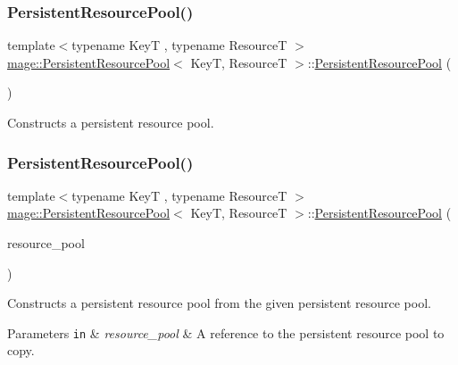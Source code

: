 \subsubsection{\texorpdfstring{Persistent\+Resource\+Pool()}{PersistentResourcePool()}\hspace{0.1cm}{\footnotesize\ttfamily [1/3]}}
{\footnotesize\ttfamily template$<$typename KeyT , typename ResourceT $>$ \\
\hyperlink{classmage_1_1_persistent_resource_pool}{mage\+::\+Persistent\+Resource\+Pool}$<$ KeyT, ResourceT $>$\+::\hyperlink{classmage_1_1_persistent_resource_pool}{Persistent\+Resource\+Pool} (\begin{DoxyParamCaption}{ }\end{DoxyParamCaption})\hspace{0.3cm}{\ttfamily [default]}}

Constructs a persistent resource pool. \hypertarget{classmage_1_1_persistent_resource_pool_a2677ca539988ead5d75be68110b6baee}{}\label{classmage_1_1_persistent_resource_pool_a2677ca539988ead5d75be68110b6baee} 
\subsubsection{\texorpdfstring{Persistent\+Resource\+Pool()}{PersistentResourcePool()}\hspace{0.1cm}{\footnotesize\ttfamily [2/3]}}
{\footnotesize\ttfamily template$<$typename KeyT , typename ResourceT $>$ \\
\hyperlink{classmage_1_1_persistent_resource_pool}{mage\+::\+Persistent\+Resource\+Pool}$<$ KeyT, ResourceT $>$\+::\hyperlink{classmage_1_1_persistent_resource_pool}{Persistent\+Resource\+Pool} (\begin{DoxyParamCaption}\item[{const \hyperlink{classmage_1_1_persistent_resource_pool}{Persistent\+Resource\+Pool}$<$ KeyT, ResourceT $>$ \&}]{resource\+\_\+pool }\end{DoxyParamCaption})\hspace{0.3cm}{\ttfamily [delete]}}

Constructs a persistent resource pool from the given persistent resource pool.


\begin{DoxyParams}[1]{Parameters}
\mbox{\tt in}  & {\em resource\+\_\+pool} & A reference to the persistent resource pool to copy. \\
\hline
\end{DoxyParams}
\hypertarget{classmage_1_1_persistent_resource_pool_a44cbe367cdf7e1066c38a4c177b05fb7}{}\label{classmage_1_1_persistent_resource_pool_a44cbe367cdf7e1066c38a4c177b05fb7} 
